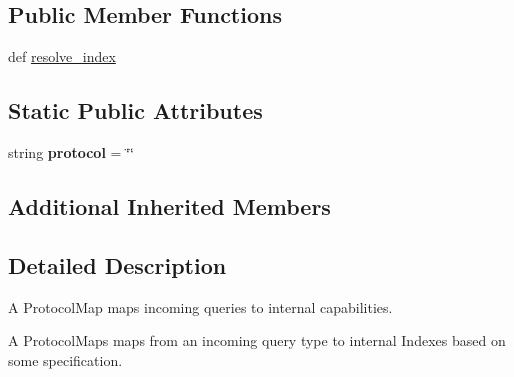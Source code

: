 \subsection*{Public Member Functions}
\begin{DoxyCompactItemize}
\item 
def \hyperlink{classcheshire3_1_1base_objects_1_1_protocol_map_a339218869c862b4f0fe9c566d6716d75}{resolve\-\_\-index}
\end{DoxyCompactItemize}
\subsection*{Static Public Attributes}
\begin{DoxyCompactItemize}
\item 
\hypertarget{classcheshire3_1_1base_objects_1_1_protocol_map_a1fda996ba75d463ff70f3b1a75c860f7}{string {\bfseries protocol} = \char`\"{}\char`\"{}}\label{classcheshire3_1_1base_objects_1_1_protocol_map_a1fda996ba75d463ff70f3b1a75c860f7}

\end{DoxyCompactItemize}
\subsection*{Additional Inherited Members}


\subsection{Detailed Description}
\begin{DoxyVerb}A ProtocolMap maps incoming queries to internal capabilities.

A ProtocolMaps maps from an incoming query type to internal Indexes based 
on some specification.
\end{DoxyVerb}
 

